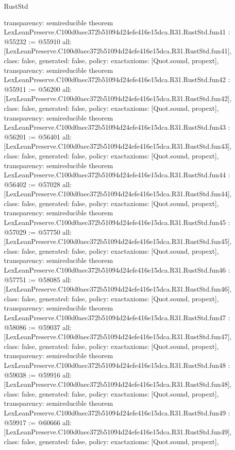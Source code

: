 \begin{lexlean}{RustStd}
\begin{coremodule}
{  transparency: semireducible
}
theorem LexLeanPreserve.C100d0aec372b51094d24efe416e15dca.R31.RustStd.fun41 : @55232 := @55910 {
  all: [LexLeanPreserve.C100d0aec372b51094d24efe416e15dca.R31.RustStd.fun41],
  class: false,
  generated: false,
  policy: exact{axioms: [Quot.sound, propext]},
  transparency: semireducible
}
theorem LexLeanPreserve.C100d0aec372b51094d24efe416e15dca.R31.RustStd.fun42 : @55911 := @56200 {
  all: [LexLeanPreserve.C100d0aec372b51094d24efe416e15dca.R31.RustStd.fun42],
  class: false,
  generated: false,
  policy: exact{axioms: [Quot.sound, propext]},
  transparency: semireducible
}
theorem LexLeanPreserve.C100d0aec372b51094d24efe416e15dca.R31.RustStd.fun43 : @56201 := @56401 {
  all: [LexLeanPreserve.C100d0aec372b51094d24efe416e15dca.R31.RustStd.fun43],
  class: false,
  generated: false,
  policy: exact{axioms: [Quot.sound, propext]},
  transparency: semireducible
}
theorem LexLeanPreserve.C100d0aec372b51094d24efe416e15dca.R31.RustStd.fun44 : @56402 := @57028 {
  all: [LexLeanPreserve.C100d0aec372b51094d24efe416e15dca.R31.RustStd.fun44],
  class: false,
  generated: false,
  policy: exact{axioms: [Quot.sound, propext]},
  transparency: semireducible
}
theorem LexLeanPreserve.C100d0aec372b51094d24efe416e15dca.R31.RustStd.fun45 : @57029 := @57750 {
  all: [LexLeanPreserve.C100d0aec372b51094d24efe416e15dca.R31.RustStd.fun45],
  class: false,
  generated: false,
  policy: exact{axioms: [Quot.sound, propext]},
  transparency: semireducible
}
theorem LexLeanPreserve.C100d0aec372b51094d24efe416e15dca.R31.RustStd.fun46 : @57751 := @58085 {
  all: [LexLeanPreserve.C100d0aec372b51094d24efe416e15dca.R31.RustStd.fun46],
  class: false,
  generated: false,
  policy: exact{axioms: [Quot.sound, propext]},
  transparency: semireducible
}
theorem LexLeanPreserve.C100d0aec372b51094d24efe416e15dca.R31.RustStd.fun47 : @58086 := @59037 {
  all: [LexLeanPreserve.C100d0aec372b51094d24efe416e15dca.R31.RustStd.fun47],
  class: false,
  generated: false,
  policy: exact{axioms: [Quot.sound, propext]},
  transparency: semireducible
}
theorem LexLeanPreserve.C100d0aec372b51094d24efe416e15dca.R31.RustStd.fun48 : @59038 := @59916 {
  all: [LexLeanPreserve.C100d0aec372b51094d24efe416e15dca.R31.RustStd.fun48],
  class: false,
  generated: false,
  policy: exact{axioms: [Quot.sound, propext]},
  transparency: semireducible
}
theorem LexLeanPreserve.C100d0aec372b51094d24efe416e15dca.R31.RustStd.fun49 : @59917 := @60666 {
  all: [LexLeanPreserve.C100d0aec372b51094d24efe416e15dca.R31.RustStd.fun49],
  class: false,
  generated: false,
  policy: exact{axioms: [Quot.sound, propext]},
}
\end{coremodule}
\end{lexlean}
